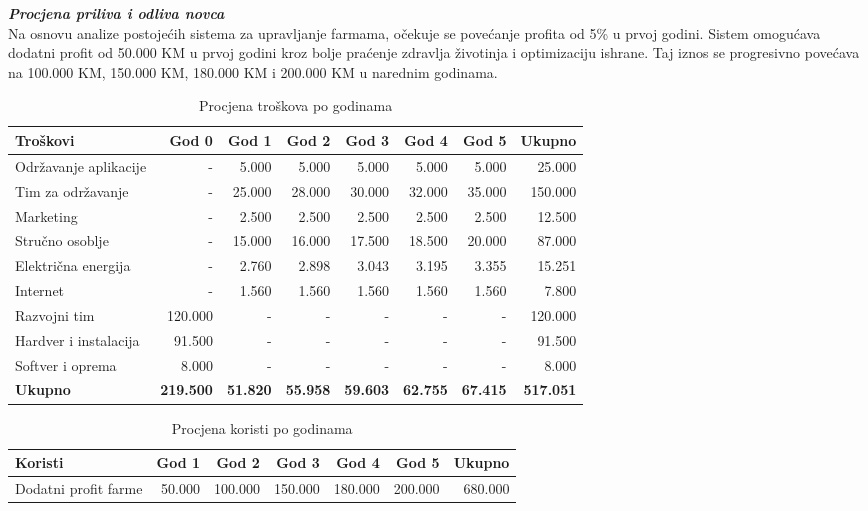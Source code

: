 \documentclass{article}
\begin{document}
\noindent
\textbf{\textit{Procjena priliva i odliva novca}}\\

\noindent
Na osnovu analize postojećih sistema za upravljanje farmama, očekuje se povećanje profita od 5\% u prvoj godini. Sistem omogućava dodatni profit od 50.000 KM u prvoj godini kroz bolje praćenje zdravlja životinja i optimizaciju ishrane. Taj iznos se progresivno povećava na 100.000 KM, 150.000 KM, 180.000 KM i 200.000 KM u narednim godinama.

\begin{table}[h]
\centering
\caption{Procjena troškova po godinama}
\begin{tabular}{|l|r|r|r|r|r|r|r|}
\hline
\textbf{Troškovi} & \textbf{God 0} & \textbf{God 1} & \textbf{God 2} & \textbf{God 3} & \textbf{God 4} & \textbf{God 5} & \textbf{Ukupno} \\ \hline
Održavanje aplikacije & - & 5.000 & 5.000 & 5.000 & 5.000 & 5.000 & 25.000 \\ \hline
Tim za održavanje & - & 25.000 & 28.000 & 30.000 & 32.000 & 35.000 & 150.000 \\ \hline
Marketing & - & 2.500 & 2.500 & 2.500 & 2.500 & 2.500 & 12.500 \\ \hline
Stručno osoblje & - & 15.000 & 16.000 & 17.500 & 18.500 & 20.000 & 87.000 \\ \hline
Električna energija & - & 2.760 & 2.898 & 3.043 & 3.195 & 3.355 & 15.251 \\ \hline
Internet & - & 1.560 & 1.560 & 1.560 & 1.560 & 1.560 & 7.800 \\ \hline
Razvojni tim & 120.000 & - & - & - & - & - & 120.000 \\ \hline
Hardver i instalacija & 91.500 & - & - & - & - & - & 91.500 \\ \hline
Softver i oprema & 8.000 & - & - & - & - & - & 8.000 \\ \hline
\textbf{Ukupno} & \textbf{219.500} & \textbf{51.820} & \textbf{55.958} & \textbf{59.603} & \textbf{62.755} & \textbf{67.415} & \textbf{517.051} \\ \hline
\end{tabular}
\end{table}

\begin{table}[h]
\centering
\caption{Procjena koristi po godinama}
\begin{tabular}{|l|r|r|r|r|r|r|}
\hline
\textbf{Koristi} & \textbf{God 1} & \textbf{God 2} & \textbf{God 3} & \textbf{God 4} & \textbf{God 5} & \textbf{Ukupno} \\ \hline
Dodatni profit farme & 50.000 & 100.000 & 150.000 & 180.000 & 200.000 & 680.000 \\ \hline
\end{tabular}
\end{table}
\end{document}
